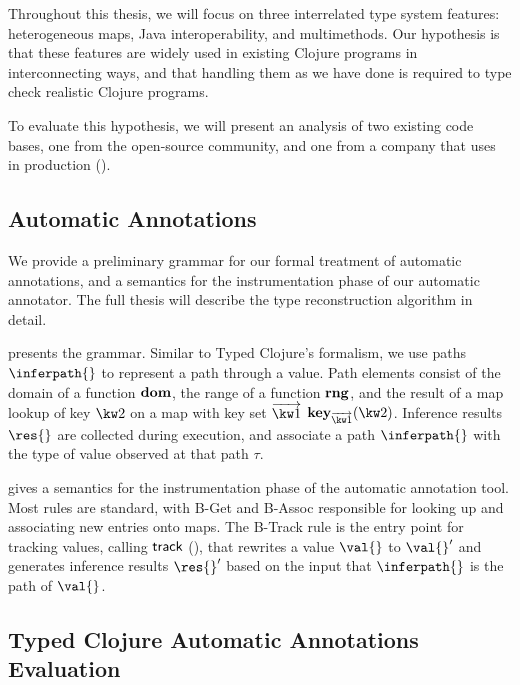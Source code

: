 \documentclass[9pt]{extarticle}
\begin{document}
Throughout this thesis, we will focus on three interrelated type
system features: heterogeneous maps, Java interoperability, and
multimethods. Our hypothesis is that these features are widely used in
existing Clojure programs in interconnecting ways, and that handling
them as we have done is required to type check realistic Clojure
programs.

To evaluate this hypothesis, we will present an analysis of two existing \coretyped{}
code bases, one from the open-source community, and one from a company
that uses \coretyped{} in production ().


\subsection{Automatic Annotations}

We provide a preliminary grammar for our formal treatment of automatic
annotations, and a semantics for the instrumentation phase
of our automatic annotator.
The full thesis will describe the type reconstruction algorithm in
detail.

 presents the grammar. Similar to Typed Clojure's
formalism, we use paths $\inferpath{}$ to represent a path through
a value. Path elements consist of the domain of a function $\textbf{dom}{}$,
the range of a function $\textbf{rng}{}$, and the result of a map lookup 
of key ${\kw2{}}$ on a map with key set ${\overrightarrow{\kw1{}}}$
$\inferkeype{\overrightarrow{\kw1{}}}{\kw2{}}$.
Inference results $\res{}$ are collected during execution, and
associate a path $\inferpath{}$ with the type of value observed
at that path $\tau$.

 gives a semantics for the instrumentation
phase of the automatic annotation tool.
Most rules are standard, with B-Get and B-Assoc responsible for
looking up and associating new entries onto maps.
The B-Track rule is the entry point for tracking values,
calling $\mathsf{track}{}$ (), that
rewrites a value $\val{}$ to $\val{}'$ and generates inference
results $\res{}'$ based on the input that $\inferpath{}$
is the path of $\val{}$.





\subsection{Typed Clojure Automatic Annotations Evaluation}
\end{document}
